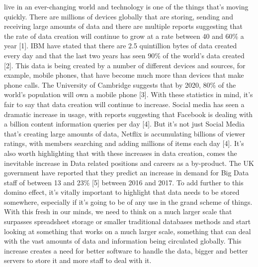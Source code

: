 \documentclass[10pt,journal,compsoc]{IEEEtran}
\begin{document}
 live in an ever-changing world and technology is one of the things that's moving quickly. There are millions of devices globally that are storing, sending and receiving large amounts of data and there are multiple reports suggesting that the rate of data creation will continue to grow at a rate between 40 and 60\% a year [1]. IBM have stated that there are 2.5 quintillion bytes of data created every day and that the last two years has seen 90\% of the world's data created [2]. This data is being created by a number of different devices and sources, for example, mobile phones, that have become much more than devices that make phone calls. The University of Cambridge suggests that by 2020, 80\% of the world’s population will own a mobile phone [3]. With these statistics in mind, it's fair to say that data creation will continue to increase. Social media has seen a dramatic increase in usage, with reports suggesting that Facebook is dealing with a billion content information queries per day [4]. But it's not just Social Media that's creating large amounts of data, Netflix is accumulating billions of viewer ratings, with members searching and adding millions of items each day [4]. It's also worth highlighting that with these increases in data creation, comes the inevitable increase in Data related positions and careers as a by-product. The UK government have reported that they predict an increase in demand for Big Data staff of between 13 and 23\% [5] between 2016 and 2017. To add further to this domino effect, it's vitally important to highlight that data needs to be stored somewhere, especially if it's going to be of any use in the grand scheme of things. With this fresh in our minds, we need to think on a much larger scale that surpasses spreadsheet storage or smaller traditional databases methods and start looking at something that works on a much larger scale, something that can deal with the vast amounts of data and information being circulated globally. This increase creates a need for better software to handle the data, bigger and better servers to store it and more staff to deal with it.\\
\end{document}
